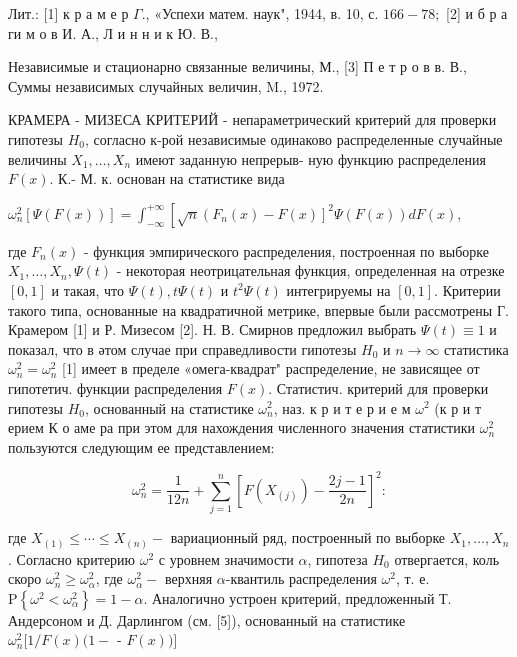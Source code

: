 \documentclass[10pt]{article}
\begin{document}
Лит.: [1] к р а м е р $\Gamma$., «Успехи матем. наук", 1944, в. 10, с. $166-78 ;$ [2] и б р а ги м о в И. А., Л и н н и к Ю. В.,

Независимые и стационарно связанные величины, М., [3] П е т р о в в. В., Суммы независимых случайных величин, M., 1972.



КРАМЕРА - МИЗЕСА КРИТЕРИЙ - непараметрический критерий для проверки гипотезы $H_{0}$, согласно к-рой независимые одинаково распределенные случайные величины $X_{1}, \ldots, X_{n}$ имеют заданную непрерыв- ную функцию распределения $F(x)$. К.- М. к. основан на статистике вида



$\omega_{n}^{2}[\Psi(F(x))]=\int_{-\infty}^{+\infty}\left[\sqrt{n}\left(F_{n}(x)-F(x)\right]^{2} \Psi(F(x)) d F(x)\right.$,



где $F_{n}(x)$ - функция эмпирического распределения, построенная по выборке $X_{1}, \ldots, X_{n}, \Psi(t)$ - некоторая неотрицательная функция, определенная на отрезке $[0,1]$ и такая, что $\Psi(t), t \Psi(t)$ и $t^{2} \Psi(t)$ интегрируемы на $[0,1]$. Критерии такого типа, основанные на квадратичной метрике, впервые были рассмотрены Г. Крамером [1] и Р. Мизесом [2]. Н. В. Смирнов предложил выбрать $\Psi(t) \equiv 1$ и показал, что в әтом случае при справедливости гипотезы $H_{0}$ и $n \rightarrow \infty$ статистика $\omega_{n}^{2}=\omega_{n}^{2}$ [1] имеет в пределе «омега-квадрат" распределение, не зависящее от гипотетич. функции распределения $F(x)$. Статистич. критерий для проверки гипотезы $H_{0}$, основанный на статистике $\omega_{n}^{2}$, наз. к р и т е р и е м $\omega^{2}$ (к р и т ерием К о аме ра при этом для нахождения численного значения статистики $\omega_{n}^{2}$ пользуются следующим ее представлением:



\[

\omega_{n}^{2}=\frac{1}{12 n}+\sum_{j=1}^{n}\left[F\left(X_{(j)}\right)-\frac{2 j-1}{2 n}\right]^{2}:

\]



где $X_{(1)} \leqslant \cdots \leqslant X_{(n)}-$ вариационный ряд, построенный по выборке $X_{1}, \ldots, X_{n}$. Согласно критерию $\omega^{2}$ с уровнем значимости $\alpha$, гипотеза $H_{0}$ отвергается, коль скоро $\omega_{n}^{2} \geqslant \omega_{\alpha}^{2}$, где $\omega_{\alpha}^{2}-$ верхняя $\alpha$-квантиль распределения $\omega^{2}$, т. е. $\mathrm{P}\left\{\omega^{2}<\omega_{\alpha}^{2}\right\}=1-\alpha$. Аналогично устроен критерий, предложенный Т. Андерсоном и Д. Дарлингом (см. [5]), основанный на статистике $\omega_{n}^{2}[1 / F(x)(1-$ - $F(x))]$
\end{document}

